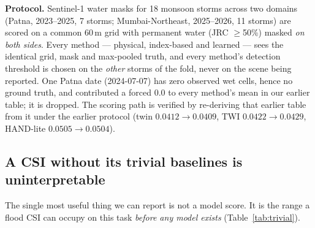 \documentclass[10pt]{article}
\begin{document}
\textbf{Protocol.} Sentinel-1 water masks for 18 monsoon storms across two domains (Patna,
2023--2025, 7 storms; Mumbai-Northeast, 2025--2026, 11 storms) are scored on a common 60\,m grid
with permanent water (JRC $\ge$50\%) masked \emph{on both sides}. Every method --- physical,
index-based and learned --- sees the identical grid, mask and max-pooled truth, and every method's
detection threshold is chosen on the \emph{other} storms of the fold, never on the scene being
reported. One Patna date (2024-07-07) has zero observed wet cells, hence no ground truth, and
contributed a forced $0.0$ to every method's mean in our earlier table; it is dropped. The
scoring path is verified by re-deriving that earlier table from it under the earlier protocol
(twin $0.0412\!\to\!0.0409$, TWI $0.0422\!\to\!0.0429$, HAND-lite $0.0505\!\to\!0.0504$).

\subsection{A CSI without its trivial baselines is uninterpretable}
The single most useful thing we can report is not a model score. It is the range a flood CSI can
occupy on this task \emph{before any model exists} (Table~\ref{tab:trivial}).
\end{document}
